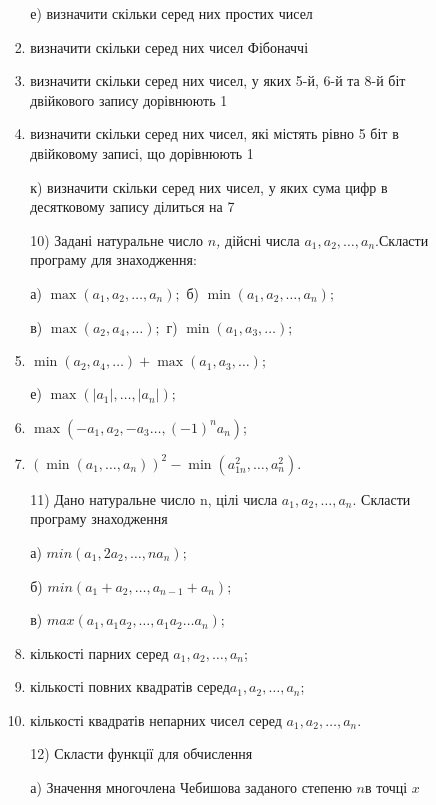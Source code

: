 \documentclass[]{article}
\makeatletter
\newcommand{\xslalph}[1]{\expandafter\@xslalph\csname c@#1\endcsname}
\newcommand{\@xslalph}[1]{%
    \ifcase#1\or а\or б\or в\or г\or д\or e\or є\or ж\or з\or i%
    \or й\or к\or л\or м\or н\or о\or п\or р\or с\or т%
    \or у\or ф\or х\or ц\or ч\or ш\or ю\or я\or аа\or бб\or вв%
    \else\@ctrerr\fi%
}
\makeatother
\begin{document}
\begin{enumerate}
\begin{enumerate}[label=\xslalph*)]
\begin{enumerate}
\begin{enumerate}[label=\xslalph*)]
е) визначити скільки серед них простих чисел

\item визначити скільки серед них чисел Фібоначчі

\item визначити скільки серед них чисел, у яких 5-й, 6-й та 8-й біт
двійкового запису дорівнюють 1

\item визначити скільки серед них чисел, які містять рівно 5 біт в
двійковому записі, що дорівнюють 1

к) визначити скільки серед них чисел, у яких сума цифр в десятковому
запису ділиться на 7

10) Задані натуральне число \(n\)\emph{,} дійсні числа
\(a_{1},a_{2},\ldots,a_{n}.\)Скласти програму для знаходження:

а) \(\max\left( a_{1},a_{2},\ldots,a_{n} \right);\) б)
\(\min\left( a_{1},a_{2},\ldots,a_{n} \right);\)

в) \(\max\left( a_{2},a_{4},\ldots \right);\) г)
\(\min\left( a_{1},a_{3},\ldots \right);\)
\item
\(\min\left( a_{2},a_{4},\ldots \right) + \max\left( a_{1},a_{3},\ldots \right);\)

е)
\(\max\left( \left| a_{1} \right|,\ldots,\left| a_{n} \right| \right);\)
\item \(\max\left( - a_{1},a_{2}, - a_{3}\ldots,( - 1)^{n}a_{n} \right);\)

\item
\(\left( \min\left( a_{1},\ldots,a_{n} \right) \right)^{2} - \min\left( a_{1n}^{2},\ldots,a_{n}^{2} \right).\)

11) Дано натуральне число n, цілі числа \(a_{1},a_{2},\ldots,a_{n}.\)
Скласти програму знаходження

а) \(min(a_{1},2a_{2},\ldots,na_{n});\)

б) \(min(a_{1} + a_{2},\ldots,a_{n - 1} + a_{n});\)

в) \(max(a_{1},a_{1}a_{2},\ldots,a_{1}a_{2}\ldots a_{n});\)
\item кількості парних серед \(a_{1},a_{2},\ldots,a_{n}\);
\item кількості повних квадратів серед\(a_{1},a_{2},\ldots,a_{n}\);
\item кількості квадратів непарних чисел серед
\(a_{1},a_{2},\ldots,a_{n}.\)

12) Скласти функції для обчислення

а) Значення многочлена Чебишова заданого степеню \(n\)в точці \(x\)


\end{enumerate}
\end{enumerate}
\end{enumerate}
\end{enumerate}
\end{document}
